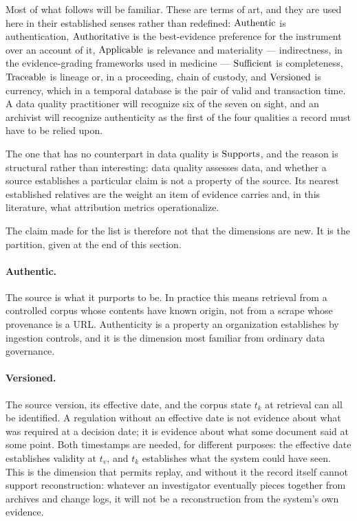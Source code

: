 Most of what follows will be familiar. These are terms of art, and they are used
here in their established senses rather than redefined: $\operatorname{Authentic}$ is
authentication, $\operatorname{Authoritative}$ is the best-evidence preference for the instrument
over an account of it, $\operatorname{Applicable}$ is relevance and materiality --- indirectness,
in the evidence-grading frameworks used in medicine --- $\operatorname{Sufficient}$ is
completeness, $\operatorname{Traceable}$ is lineage or, in a proceeding, chain of custody, and
$\operatorname{Versioned}$ is currency, which in a temporal database is the pair of valid and
transaction time. A data quality practitioner will recognize six of the seven on
sight, and an archivist will recognize authenticity as the first of the four
qualities a record must have to be relied upon.

The one that has no counterpart in data quality is $\operatorname{Supports}$, and the reason is
structural rather than interesting: data quality assesses data, and whether a
source establishes a particular claim is not a property of the source. Its nearest
established relatives are the weight an item of evidence carries and, in this
literature, what attribution metrics operationalize.

The claim made for the list is therefore not that the dimensions are new. It is the
partition, given at the end of this section.

\paragraph{Authentic.} The source is what it purports to be. In practice this means
retrieval from a controlled corpus whose contents have known origin, not from a
scrape whose provenance is a URL. Authenticity is a property an organization
establishes by ingestion controls, and it is the dimension most familiar from
ordinary data governance.

\paragraph{Versioned.} The source version, its effective date, and the corpus state
$t_k$ at retrieval can all be identified. A regulation without an effective date is
not evidence about what was required at a decision date; it is evidence about what
some document said at some point. Both timestamps are needed, for different purposes:
the effective date establishes validity at $t_v$, and $t_k$ establishes what the
system could have seen. This is the dimension that permits replay, and without it the record itself cannot
support reconstruction: whatever an investigator eventually pieces together from
archives and change logs, it will not be a reconstruction from the system's own
evidence.

